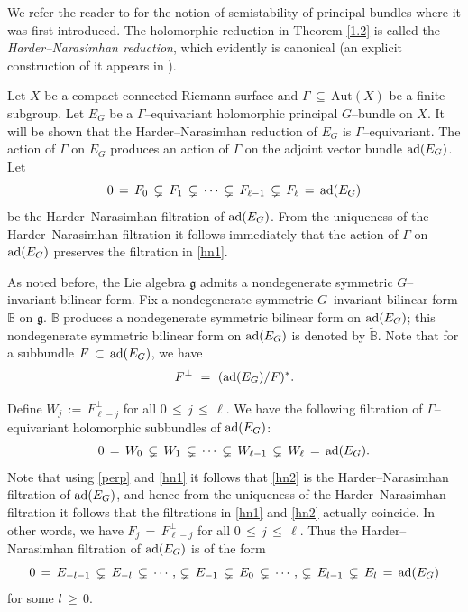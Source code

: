 \documentclass[12pt, reqno]{amsart}
\numberwithin{equation}{section}
\newcommand{\Aut}{\textrm{Aut}}
\begin{document}
We refer the reader to \cite{Ra1} for the notion of semistability of principal bundles where it was first 
introduced. The holomorphic reduction in Theorem \ref{1.2} is called the {\it Harder--Narasimhan reduction}, 
which evidently is canonical (an explicit construction of it appears in \cite[Lemma 2.11]{AB2}).

Let $X$ be a compact connected Riemann surface and $\Gamma\,\subseteq\, \Aut(X)$ be a finite subgroup. Let 
$E_{G}$ be a $\Gamma$--equivariant holomorphic principal $G$--bundle on $X$. It will be shown that the 
Harder--Narasimhan reduction of $E_{G}$ is $\Gamma$--equivariant. The action of $\Gamma$ on $E_G$ produces an 
action of $\Gamma$ on the adjoint vector bundle ${\rm ad}(E_G)$. Let
\begin{equation}\label{hn1}
0\,=\,F_{0}\,\subsetneq\, F_{1}\,\subsetneq\, \cdots \,\subsetneq\, F_{\ell-1}\,\subsetneq\, F_{\ell}
\,=\, {\rm ad}(E_G)
\end{equation}
be the Harder--Narasimhan filtration of ${\rm ad}(E_G)$. From the uniqueness of the Harder--Narasimhan
filtration it follows immediately that the action of $\Gamma$ on ${\rm ad}(E_G)$ preserves the
filtration in \eqref{hn1}.

As noted before, the Lie algebra $\mathfrak g$ admits a nondegenerate symmetric $G$--invariant
bilinear form. Fix a nondegenerate symmetric $G$--invariant
bilinear form $\mathbb{B}$ on $\mathfrak{g}$. $\mathbb{B}$ produces a nondegenerate symmetric bilinear form on
${\rm ad}(E_G)$; this nondegenerate symmetric bilinear form on ${\rm ad}(E_G)$ is
denoted by $\widetilde{\mathbb{B}}$. Note that for a subbundle $F\, \subset\, {\rm ad}(E_G)$, we have
\begin{equation}\label{perp}
F^{\perp}\ =\ ({\rm ad}(E_G)/F)^{*}.
\end{equation}

Define $W_{j}\,:=\,F_{\ell-j}^{\perp}$ for all $0\,\leq\, j\,\leq\, \ell$. We have
the following filtration of $\Gamma$--equivariant holomorphic subbundles of ${\rm ad}(E_G)$:
\begin{equation}\label{hn2}
0\,=\,W_{0}\,\subsetneq\, W_{1}\,\subsetneq\,\cdots\, \subsetneq\, W_{\ell-1}\,\subsetneq\, W_{\ell}
\,=\, {\rm ad}(E_G).
\end{equation}
Note that using \eqref{perp} and \eqref{hn1} it follows that \eqref{hn2} is the Harder--Narasimhan filtration of
${\rm ad}(E_G)$, and hence from the uniqueness of the Harder--Narasimhan filtration it
follows that the filtrations in \eqref{hn1} and \eqref{hn2} actually coincide. In other words, we have
$F_{j}\,=\,F_{\ell-j}^{\perp}$ for all $0\,\leq\, j\,\leq\, \ell$. Thus the Harder--Narasimhan filtration of
${\rm ad}(E_G)$ is of the form 
\begin{equation}\label{hn3}
0\,=\,E_{-l-1}\,\subsetneq\, E_{-l}\,\subsetneq\,\cdots,\, \subsetneq\, E_{-1}\,\subsetneq\, E_{0}
\,\subsetneq\,\cdots,\, \subsetneq\, E_{l-1}\,\subsetneq\, E_{l}\,=\, {\rm ad}(E_G)
\end{equation}
for some $l\,\geq\, 0$.
\end{document}

